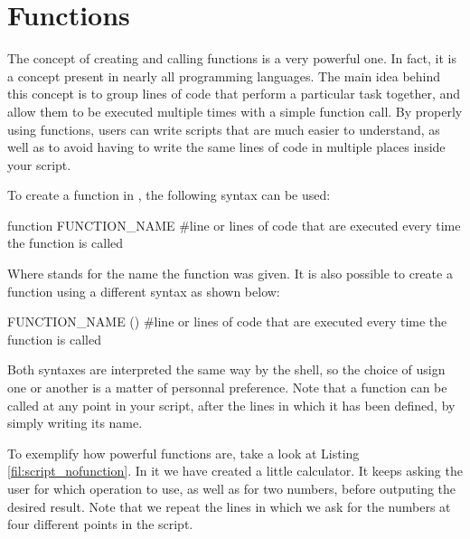 \chapter{Functions}\label{ch:functions}

The concept of creating and calling functions is a very powerful one. In fact,  it is a concept present in nearly all programming languages. The main idea behind this concept is to group lines of code that perform a particular task together, and allow them to be executed multiple times with a simple function call. By properly using functions, users can write scripts that are much easier to understand, as well as to avoid having to write the same lines of code in multiple places inside your script.

To create a function in , the following syntax can be used:

\begin{command_line}
function FUNCTION_NAME {
    #line or lines of code that are executed every time the function is called
}
\end{command_line}
Where  stands for the name the function was given. It is also possible to create a function using a different syntax as shown below:
\begin{command_line}
FUNCTION_NAME (){
    #line or lines of code that are executed every time the function is called
}
\end{command_line}
Both syntaxes are interpreted the same way by the shell, so the choice of usign one or another is a matter of personnal preference. Note that a function can be called at any point in your script, after the lines in which it has been defined, by simply writing its name. 

To exemplify how powerful functions are, take a look at Listing \ref{fil:script_nofunction}. In it we have created a little calculator. It keeps asking the user for which operation to use, as well as for two numbers, before outputing the desired result. Note that we repeat the lines in which we ask for the numbers at four different points in the script.

